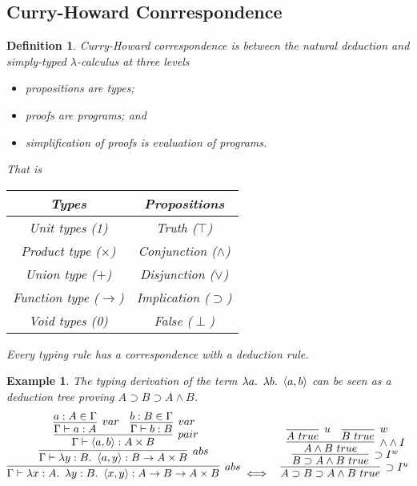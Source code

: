 \documentclass{article}
\theoremstyle{plain}
\newtheorem{example}[theorem]{Example}
\newtheorem{definition}[theorem]{Definition}
\theoremstyle{nonumberplain}
\newcommand{\lam}[2]{\ensuremath{\lambda #1\ldotp~ #2}} %
\begin{document}
\newpage
\subsection{Curry-Howard Conrrespondence}

\begin{definition}
\rm Curry-Howard correspondence is between the natural deduction and simply-typed $\lambda$-calculus at three levels
\begin{itemize}
	\item propositions are types;
	\item proofs are programs; and
	\item simplification of proofs is evaluation of programs.
\end{itemize}
That is
\begin{center}
\begin{tabular}{c|c}
Types & Propositions \\
\hline
Unit types (1) & Truth ($\top$)\\
\hline
Product type ($\times$) & Conjunction ($\wedge$) \\
\hline
Union type ($+$)& Disjunction ($\vee$) \\
\hline
Function type ($\to$) & Implication ($\supset$)\\
\hline
Void types (0) & False ($\perp$)
\end{tabular}
\end{center}
Every typing rule has a correspondence with a deduction rule. 
\end{definition}


\begin{example}
\rm The typing derivation of the term $\lam{a}{\lam{b}{\left<a,b\right>}}$ can be seen as a deduction tree proving $A \supset B \supset A \wedge B$.
\[
\begin{aligned}
	\infer[abs]{\Gamma\vdash\lam{x:A}{\lam{y:B}{\left<x,y\right>}}:A \to B \to A \times B}{\infer[abs]{\Gamma\vdash \lam{y:B}{\left<a,y\right>}:B \to A \times B}{\infer[pair]{\Gamma\vdash \left<a,b\right>: A \times B}{\infer[var]{\Gamma\vdash a:A}{a:A \in \Gamma} & \infer[var]{\Gamma\vdash b:B}{b:B \in \Gamma}}}} & \iff & 
	\infer[\supset I^u]{A \supset B \supset A \wedge B~true}{\infer[\supset I^w]{B \supset A \wedge B~true}{\infer[\wedge \wedge I]{A \wedge B ~true}{\infer[u]{A~true}{} & \infer[w]{B~true}{}}}}		
\end{aligned}
\]
\end{example}
\end{document}
